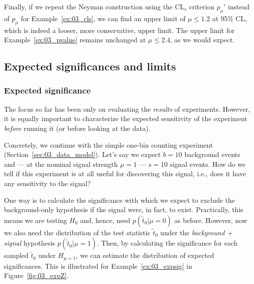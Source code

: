 Finally, if we repeat the Neyman construction using the CL$_s$ criterion $p_\mu'$ instead of $p_\mu$ for Example~\ref{ex:03_cls}, we can find an upper limit of $\mu \leq 1.2$ at 95\% CL, which is indeed a looser, more conservative, upper limit. 
The upper limit for Example~\ref{ex:03_pvalue} remains unchanged at $\mu \leq 2.4$, as we would expect.


\subsection{Expected significances and limits}
\label{sec:03_expected}

\subsubsection{Expected significance}

The focus so far has been only on evaluating the \textit{results} of experiments.
However, it is equally important to characterize the expected sensitivity of the experiment \textit{before} running it (or before looking at the data).

\begin{example}
\label{ex:03_expsig}
Concretely, we continue with the simple one-bin counting experiment (Section~\ref{sec:03_data_model}).
Let's say we expect $b = 10$ background events and --- at the nominal signal strength $\mu = 1$ --- $s = 10$ signal events.
How do we tell if this experiment is at all useful for discovering this signal, i.e., does it have any sensitivity to the signal? 
\end{example}

One way is to calculate the significance with which we expect to exclude the background-only hypothesis if the signal were, in fact, to exist.
Practically, this means we are testing $H_0$ and, hence, need $p(\tilde{t}_0|\mu = 0)$ as before. However, now we also need the distribution of the test statistic $\tilde{t}_0$ under the \textit{background + signal} hypothesis $p(\tilde{t}_0|\mu = 1)$. 
Then, by calculating the significance for each sampled $\tilde{t}_0$ under $H_{\mu = 1}$, we can estimate the distribution of expected significances.
This is illustrated for Example~\ref{ex:03_expsig} in Figure~\ref{fig:03_expZ}.

